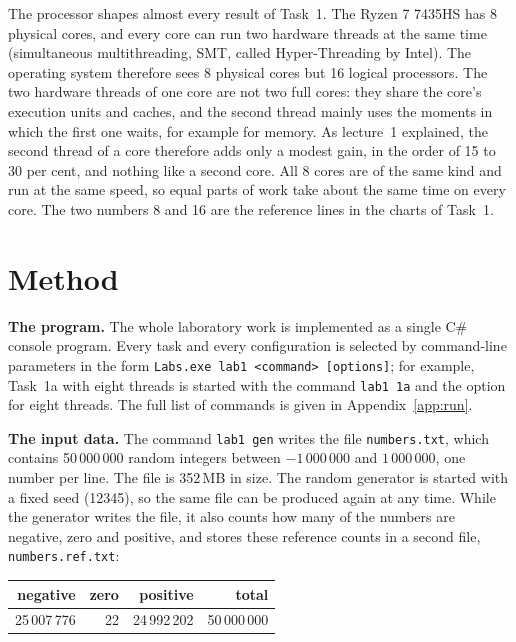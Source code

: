 \documentclass[11pt,a4paper]{article}
\newcommand{\notebox}[1]{\par\smallskip\noindent\colorbox{notebg}{\parbox{\dimexpr\linewidth-2\fboxsep}{\small #1}}\par\smallskip}
\begin{document}
The processor shapes almost every result of Task~1. The Ryzen 7 7435HS has 8 physical cores, and every
core can run two hardware threads at the same time (simultaneous multithreading, SMT, called
Hyper-Threading by Intel). The operating system therefore sees 8 physical cores but 16 logical
processors. The two hardware threads of one core are not two full cores: they share the core's
execution units and caches, and the second thread mainly uses the moments in which the first one
waits, for example for memory. As lecture~1 explained, the second thread of a core therefore adds
only a modest gain, in the order of 15 to 30 per cent, and nothing like a second core. All 8 cores
are of the same kind and run at the same speed, so equal parts of work take about the same time on
every core. The two numbers 8 and 16 are the reference lines in the charts of Task~1.


\section{Method}

\textbf{The program.} The whole laboratory work is implemented as a single C\# console program. Every
task and every configuration is selected by command-line parameters in the form
\texttt{Labs.exe lab1 <command> [options]}; for example, Task~1a with eight threads is started with
the command \texttt{lab1 1a} and the option for eight threads. The full list of commands is given in
Appendix~\ref{app:run}.

\textbf{The input data.} The command \texttt{lab1 gen} writes the file \texttt{numbers.txt}, which
contains 50\,000\,000 random integers between $-1\,000\,000$ and $1\,000\,000$, one number per line.
The file is 352\,MB in size. The random generator is started with a fixed seed (12345), so the same
file can be produced again at any time. While the generator writes the file, it also counts how many
of the numbers are negative, zero and positive, and stores these reference counts in a second file,
\texttt{numbers.ref.txt}:

\begin{center}
\small
\begin{tabular}{rrrr}
\toprule
negative & zero & positive & total \\
\midrule
25\,007\,776 & 22 & 24\,992\,202 & 50\,000\,000 \\
\bottomrule
\end{tabular}
\end{center}
\end{document}
